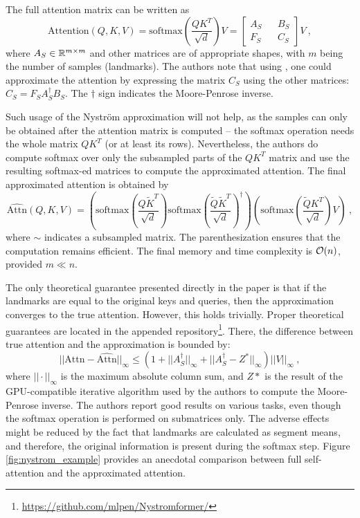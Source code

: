 The full attention matrix can be written as
\begin{equation}
        \text{Attention}(Q,K,V)=\text{softmax}\left(\frac{QK^T}{\sqrt{d}}\right)V=
        \begin{bmatrix}
                A_S && B_S \\
                F_S && C_S
        \end{bmatrix}V\ ,
\end{equation}
where $A_S\in\mathbb{R}^{m\times m}$ and other matrices are of appropriate shapes, with $m$ being the number of samples (landmarks). 
The authors note that using \citep{nystrom-matrix-approx}, one could approximate the attention by expressing the matrix $C_S$ using the other matrices: $C_S=F_SA_S^\dagger B_S$. The $\dagger$ sign indicates the Moore-Penrose inverse.

Such usage of the Nystr\"om approximation will not help, as the samples can only be obtained after the attention matrix is computed -- the softmax operation needs the whole matrix $QK^T$ (or at least its rows). 
Nevertheless, the authors do compute softmax over only the subsampled parts of the $QK^T$ matrix and use the resulting softmax-ed matrices to compute the approximated attention.
The final approximated attention is obtained by 
\begin{equation}
        \widehat{\text{Attn}}(Q,K,V)=
        \left(
        \text{softmax}\left(\frac{Q\tilde{K}^T}{\sqrt{d}}\right)
        \text{softmax}\left(\frac{\tilde{Q}\tilde{K}^T}{\sqrt{d}}\right)^\dagger
        \right)
        \left(
        \text{softmax}\left(\frac{\tilde{Q}K^T}{\sqrt{d}}\right)
        V
        \right)
        \ ,
\end{equation}
where $\sim$ indicates a subsampled matrix. The parenthesization ensures that the computation remains efficient. The final memory and time complexity is $\mathcal{O}(n)$, provided $m\ll n$.

The only theoretical guarantee presented directly in the paper is that if the landmarks are equal to the original keys and queries, then the approximation converges to the true attention. 
However, this holds trivially.
Proper theoretical guarantees are located in the appended repository\footnote{\url{https://github.com/mlpen/Nystromformer/}}.
There, the difference between true attention and the approximation is bounded by:
\begin{equation}
        ||\text{Attn}-\widehat{\text{Attn}}||_\infty\leq(1+||A^\dagger_S||_\infty+||A^\dagger_S-Z^*||_\infty)||V||_\infty\ ,
\end{equation}
where $||\cdot||_\infty$ is the maximum absolute column sum, and $Z*$ is the result of the GPU-compatible iterative algorithm \citep{iterative-moore} used by the authors to compute the Moore-Penrose inverse.
The authors report good results on various tasks, even though the softmax operation is performed on submatrices only. 
The adverse effects might be reduced by the fact that landmarks are calculated as segment means, and therefore, the original information is present during the softmax step.
Figure \ref{fig:nystrom_example} provides an anecdotal comparison between full self-attention and the approximated attention.

